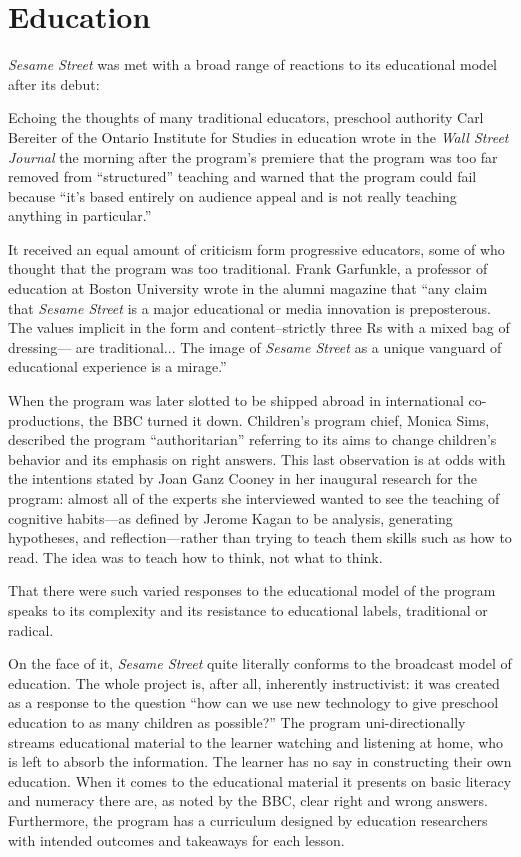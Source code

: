 \documentclass[12pt,letterpaper]{article}
\begin{document}
	\section*{Education}	
	

	\textit{Sesame Street} was met with a broad range of reactions to its 
	educational model after its debut: 

	Echoing the thoughts of many traditional educators, preschool authority
	Carl Bereiter of the Ontario Institute for Studies in education wrote in
	the \textit{Wall Street Journal} the morning after the program's 
	premiere that the program was too far removed from ``structured'' 
	teaching and warned that the program could fail because ``it's based 
	entirely on audience appeal and is not really teaching anything in 
	particular.''\autocite[200]{Davis}

	It received an equal amount of criticism form progressive educators, 
	some of who thought that the program was too traditional. Frank 
	Garfunkle, a professor of education at Boston University wrote in the 
	alumni magazine that ``any claim that \textit{Sesame Street} is a major 
	educational or media innovation is preposterous. The values implicit in
	the form and content--strictly three Rs with a mixed bag of dressing---	
	are traditional... The image of \textit{Sesame Street} as a unique 
	vanguard of educational experience is a mirage.''\autocite[201]{Davis}

	When the program was later slotted to be shipped abroad in 
	international co-productions, the BBC turned it down. Children's 
	program chief, Monica Sims, described the program ``authoritarian'' 
	referring to its aims to change children's behavior and its emphasis on 
	right answers.\autocite[211]{Davis} This last observation is at odds
	with the intentions stated by Joan Ganz Cooney in her inaugural
	research for the program: almost all of the experts she interviewed 
	wanted to see the teaching of cognitive habits---as defined by Jerome 
	Kagan to be analysis, generating hypotheses, and reflection---rather 
	than trying to teach them skills such as how to read. The idea was to
	teach how to think, not what to think.\autocite[23]{Cooney} 

	That there were such varied responses to the educational model of the
	program speaks to its complexity and its resistance to educational 
	labels, traditional or radical.   
	
	On the face of it, \textit{Sesame Street} quite literally conforms to 
	the broadcast model of education. The whole project is, after all, 
	inherently instructivist: it was created as a response to the question
	``how can we use new technology to give preschool education to as many 
	children as possible?'' The program 
	uni-directionally streams educational material to the learner watching 
	and listening at home, who is left to absorb the information. The 
	learner has no say in constructing their own education. When it comes to
	the educational material it presents on basic literacy and numeracy 
	there are, as noted by the BBC, clear right and wrong answers. 
	Furthermore, the program has a curriculum 
	designed by education researchers with intended outcomes and takeaways 
	for each lesson.\autocite[117]{Davis} 
\end{document}

